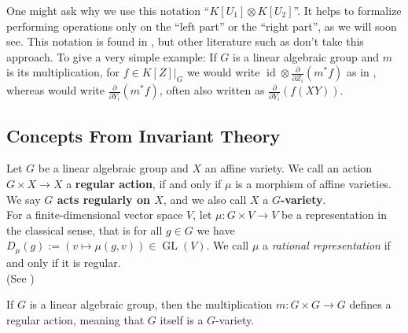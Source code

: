 \begin{remark}
One might ask why we use this notation ``$K[U_1]\otimes K[U_2]$''.
It helps to formalize performing operations only on the ``left part'' or the ``right part'', as we will soon see.
This notation is found in \cite{DK15}, but other literature such as \cite{Stu08} don't take this approach.
To give a very simple example:
If $G$ is a linear algebraic group and $m$ is its multiplication, for $f \in \left. K[Z] \right|_G$ we would write $\operatorname{id} \otimes \frac{\partial}{\partial Z_i} (m^\ast f)$ as in \cite{DK15}, whereas \cite{Stu08} would write $\frac{\partial}{\partial Y_i} (m^\ast f)$, often also written as $\frac{\partial}{\partial Y_i} (f(XY))$.
\end{remark}

\subsection{Concepts From Invariant Theory}

\begin{definition}
  Let $G$ be a linear algebraic group and $X$ an affine variety.
  We call an action $G \times X \longrightarrow X$ a \textbf{regular action}, if and only if $\mu$ is a morphism of affine varieties.
  We say \textbf{$ G $ acts regularly on $ X $}, and we also call $X$ a \textbf{$G$-variety}.\\
  For a finite-dimensional vector space $V$, let $\mu \colon G \times V \longrightarrow V$ be a representation in the classical sense, that is for all $g \in G$ we have $D_\mu (g) := (v \mapsto \mu(g,v)) \in \operatorname{GL}(V)$.
  We call $\mu$ a \textit{rational representation} if and only if it is regular.\\
  (See \cite[p.~31]{DK15})
  
\end{definition}

\begin{dexample}
  If $G$ is a linear algebraic group, then the multiplication $m \colon G \times G \longrightarrow G$ defines a regular action, meaning that $G$ itself is a $G$-variety.
\end{dexample}

